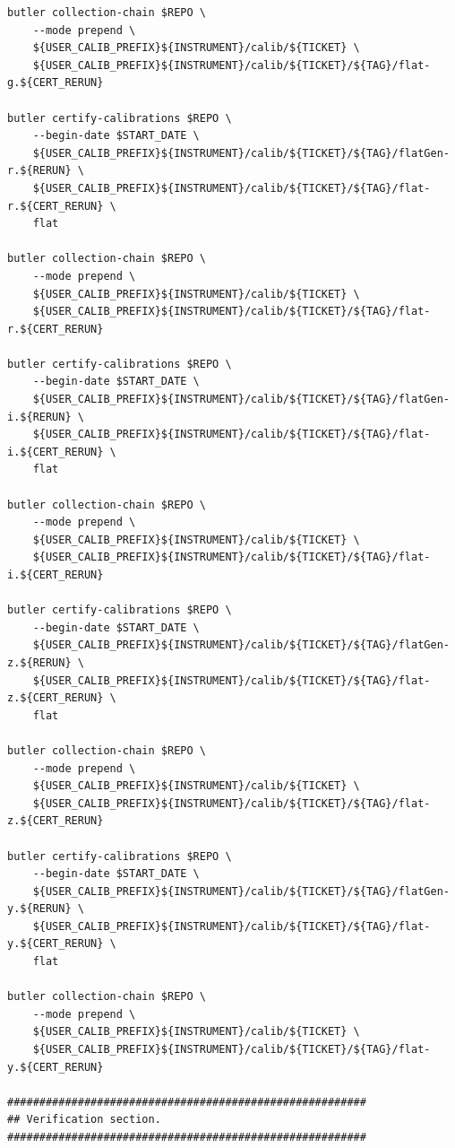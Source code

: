 \documentclass[DM,authoryear,toc]{lsstdoc}
\begin{document}
\begin{footnotesize}
\begin{verbatim}
butler collection-chain $REPO \
    --mode prepend \
    ${USER_CALIB_PREFIX}${INSTRUMENT}/calib/${TICKET} \
    ${USER_CALIB_PREFIX}${INSTRUMENT}/calib/${TICKET}/${TAG}/flat-g.${CERT_RERUN}

butler certify-calibrations $REPO \
    --begin-date $START_DATE \
    ${USER_CALIB_PREFIX}${INSTRUMENT}/calib/${TICKET}/${TAG}/flatGen-r.${RERUN} \
    ${USER_CALIB_PREFIX}${INSTRUMENT}/calib/${TICKET}/${TAG}/flat-r.${CERT_RERUN} \
    flat

butler collection-chain $REPO \
    --mode prepend \
    ${USER_CALIB_PREFIX}${INSTRUMENT}/calib/${TICKET} \
    ${USER_CALIB_PREFIX}${INSTRUMENT}/calib/${TICKET}/${TAG}/flat-r.${CERT_RERUN}

butler certify-calibrations $REPO \
    --begin-date $START_DATE \
    ${USER_CALIB_PREFIX}${INSTRUMENT}/calib/${TICKET}/${TAG}/flatGen-i.${RERUN} \
    ${USER_CALIB_PREFIX}${INSTRUMENT}/calib/${TICKET}/${TAG}/flat-i.${CERT_RERUN} \
    flat

butler collection-chain $REPO \
    --mode prepend \
    ${USER_CALIB_PREFIX}${INSTRUMENT}/calib/${TICKET} \
    ${USER_CALIB_PREFIX}${INSTRUMENT}/calib/${TICKET}/${TAG}/flat-i.${CERT_RERUN}

butler certify-calibrations $REPO \
    --begin-date $START_DATE \
    ${USER_CALIB_PREFIX}${INSTRUMENT}/calib/${TICKET}/${TAG}/flatGen-z.${RERUN} \
    ${USER_CALIB_PREFIX}${INSTRUMENT}/calib/${TICKET}/${TAG}/flat-z.${CERT_RERUN} \
    flat

butler collection-chain $REPO \
    --mode prepend \
    ${USER_CALIB_PREFIX}${INSTRUMENT}/calib/${TICKET} \
    ${USER_CALIB_PREFIX}${INSTRUMENT}/calib/${TICKET}/${TAG}/flat-z.${CERT_RERUN}

butler certify-calibrations $REPO \
    --begin-date $START_DATE \
    ${USER_CALIB_PREFIX}${INSTRUMENT}/calib/${TICKET}/${TAG}/flatGen-y.${RERUN} \
    ${USER_CALIB_PREFIX}${INSTRUMENT}/calib/${TICKET}/${TAG}/flat-y.${CERT_RERUN} \
    flat

butler collection-chain $REPO \
    --mode prepend \
    ${USER_CALIB_PREFIX}${INSTRUMENT}/calib/${TICKET} \
    ${USER_CALIB_PREFIX}${INSTRUMENT}/calib/${TICKET}/${TAG}/flat-y.${CERT_RERUN}

########################################################
## Verification section.
########################################################


\end{verbatim}
\end{footnotesize}
\end{document}
